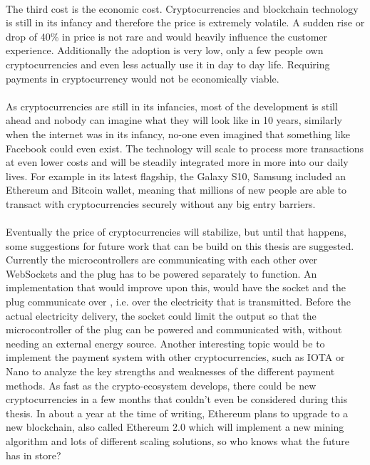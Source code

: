 \\
The third cost is the economic cost. Cryptocurrencies and blockchain technology is still in its infancy and therefore the price is extremely volatile. A sudden rise or drop of 40\% in price is not rare and would heavily influence the customer experience. Additionally the adoption is very low, only a few people own cryptocurrencies and even less actually use it in day to day life. Requiring payments in cryptocurrency would not be economically viable.
\\\\
As cryptocurrencies are still in its infancies, most of the development is still ahead and nobody can imagine what they will look like in 10 years, similarly when the internet was in its infancy, no-one even imagined that something like Facebook could even exist. The technology will scale to process more transactions at even lower costs and will be steadily integrated more in more into our daily lives. For example in its latest flagship, the Galaxy S10, Samsung included an Ethereum and Bitcoin wallet, meaning that millions of new people are able to transact with cryptocurrencies securely without any big entry barriers.
\\\\
Eventually the price of cryptocurrencies will stabilize, but until that happens, some suggestions for future work that can be build on this thesis are suggested. Currently the microcontrollers are communicating with each other over WebSockets and the plug has to be powered separately to function. An implementation that would improve upon this, would have the socket and the plug communicate over , i.e. over the electricity that is transmitted. Before the actual electricity delivery, the socket could limit the output so that the microcontroller of the plug can be powered and communicated with, without needing an external energy source. Another interesting topic would be to implement the payment system with other cryptocurrencies, such as IOTA or Nano to analyze the key strengths and weaknesses of the different payment methods. As fast as the crypto-ecosystem develops, there could be new cryptocurrencies in a few months that couldn’t even be considered during this thesis. In about a year at the time of writing, Ethereum plans to upgrade to a new blockchain, also called Ethereum 2.0\cite{eth-2} which will implement a new mining algorithm and lots of different scaling solutions, so who knows what the future has in store?
